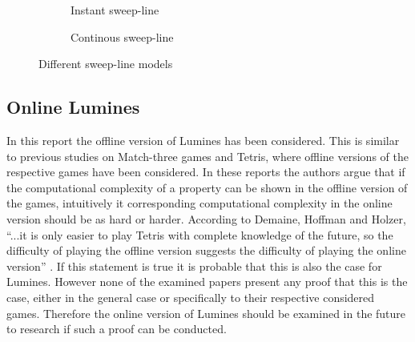 \begin{figure}[h]
    \centering
    \begin{subfigure}[b]{0.6\textwidth}
        \caption{Instant sweep-line}
        \vspace*{0.5cm}
    \end{subfigure}

    \begin{subfigure}[b]{0.6\textwidth}
        \caption{Continous sweep-line}
        \vspace*{0.5cm}
    \end{subfigure}
    \caption{Different sweep-line models}
    \label{fig:sweep}
\end{figure}


\subsection{Online Lumines}

In this report the offline version of Lumines has been considered. This is similar to previous studies on Match-three games and Tetris, where offline versions of the respective games have been considered. In these reports the authors argue that if the computational complexity of a property can be shown in the offline version of the games, intuitively it corresponding computational complexity in the online version should be as hard or harder. According to Demaine, Hoffman and Holzer, ``...it is only easier to play Tetris with complete knowledge of the future, so the difficulty of playing the offline version suggests the difficulty of playing the online version'' \cite[p. 2]{tetris}. If this statement is true it is probable that this is also the case for Lumines. However none of the examined papers present any proof that this is the case, either in the general case or specifically to their respective considered games. Therefore the online version of Lumines should be examined in the future to research if such a proof can be conducted.


